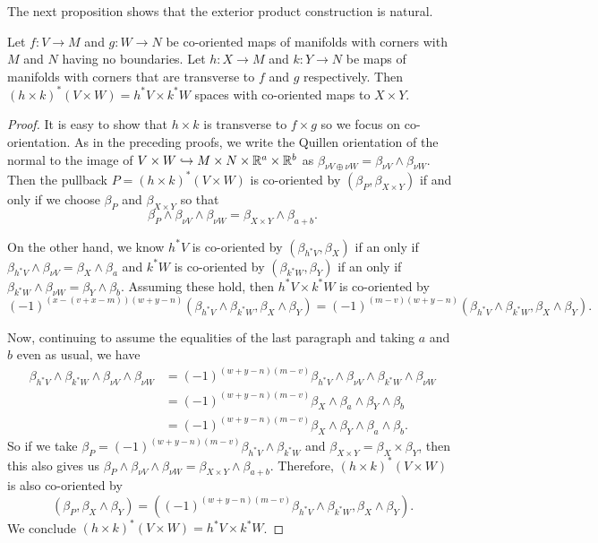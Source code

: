 The next proposition shows that the exterior product construction is natural.

\begin{proposition}\label{P: natural exterior}
	Let $f \colon V \to M$ and $g \colon W \to N$ be co-oriented maps of manifolds with corners with $M$ and $N$ having no boundaries.
	Let $h \colon X \to M$ and $k \colon Y \to N$ be maps of manifolds with corners that are transverse to $f$ and $g$ respectively.
	Then $(h \times k)^*(V \times W) = h^*V \times k^*W$ spaces with co-oriented maps to $X \times Y$.
\end{proposition}

\begin{proof}
	It is easy to show that $h \times k$ is transverse to $f \times g$ so we focus on co-orientation.
	As in the preceding proofs, we write the Quillen orientation of the normal to the image of $V \times W \hookrightarrow M \times N \times \mathbb{R}^a \times \mathbb{R}^b$ as $\beta_{\nu V \oplus \nu W} = \beta_{\nu V} \wedge \beta_{\nu W}$.
	Then the pullback $P = (h \times k)^*(V \times W)$ is co-oriented by $(\beta_P,\beta_{X \times Y})$ if and only if we choose $\beta_P$ and $\beta_{X \times Y}$ so that
	$$\beta_{P} \wedge \beta_{\nu V} \wedge \beta_{\nu W} = \beta_{X \times Y} \wedge \beta_{a+b}.$$

	On the other hand, we know $h^*V$ is co-oriented by $(\beta_{h^*V},\beta_X)$ if an only if $\beta_{h^*V} \wedge \beta_{\nu V} = \beta_X \wedge \beta_a$ and $k^*W$ is co-oriented by $(\beta_{k^*W},\beta_Y)$ if an only if $\beta_{k^*W} \wedge \beta_{\nu W} = \beta_Y \wedge \beta_b$.
	Assuming these hold, then $h^*V \times k^*W$ is co-oriented by $$(-1)^{(x-(v+x-m))(w+y-n)}(\beta_{h^*V} \wedge \beta_{k^*W},\beta_X \wedge \beta_Y) = (-1)^{(m-v)(w+y-n)}(\beta_{h^*V} \wedge \beta_{k^*W},\beta_X \wedge \beta_Y).$$

	Now, continuing to assume the equalities of the last paragraph and taking $a$ and $b$ even as usual, we have
	\begin{align*}
		\beta_{h^*V} \wedge \beta_{k^*W} \wedge \beta_{\nu V} \wedge \beta_{\nu W}
		& = (-1)^{(w+y-n)(m-v)}\beta_{h^*V} \wedge \beta_{\nu V} \wedge \beta_{k^*W} \wedge \beta_{\nu W}\\
		& = (-1)^{(w+y-n)(m-v)}\beta_X \wedge \beta_a \wedge \beta_Y \wedge \beta_b \\
		& = (-1)^{(w+y-n)(m-v)}\beta_X \wedge \beta_Y \wedge \beta_a \wedge \beta_b.
	\end{align*}
	So if we take $\beta_P = (-1)^{(w+y-n)(m-v)}\beta_{h^*V} \wedge \beta_{k^*W}$ and $\beta_{X \times Y} = \beta_X \times \beta_Y$, then this also gives us $\beta_{P} \wedge \beta_{\nu V} \wedge \beta_{\nu W} = \beta_{X \times Y} \wedge \beta_{a+b}$.
	Therefore,
	$(h \times k)^*(V \times W)$ is also co-oriented by
	$$(\beta_P,\beta_X \wedge \beta_Y) = ((-1)^{(w+y-n)(m-v)}\beta_{h^*V} \wedge \beta_{k^*W},\beta_X \wedge \beta_Y).$$ We conclude $(h \times k)^*(V \times W) = h^*V \times k^*W$.
\end{proof}


